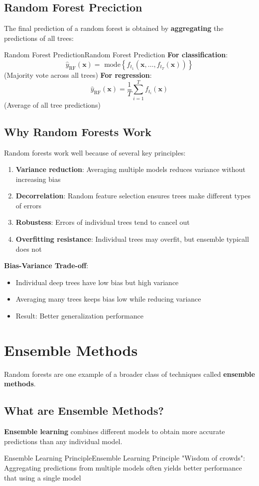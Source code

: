 \documentclass[a4paper]{article}
\theoremstyle{definition}
\begin{document}
\subsection{Random Forest Preciction}
The final prediction of a random forest is obtained by \textbf{aggregating} the predictions of all trees:
\begin{definition}{Random Forest Prediction}{Random Forest Prediction}
\textbf{For classification}:
\[
  \hat{y}_{\text{RF}}(\mathbf{x}) = \text{ mode}\left\{ f_{t_1}(\mathbf{x}, \ldots, f_{t_T}(\mathbf{x})) \right\} 
\]
(Majority vote across all trees)
\vspace{1em}
\noindent
\newline
\textbf{For regression}:
\[
  \hat{y}_{\text{RF}}(\mathbf{x}) = \frac{1}{T} \sum_{i = 1}^{T} f_{t_i}(\mathbf{x})
\]
(Average of all tree predictions)
\end{definition}
\subsection{Why Random Forests Work}
Random forests work well because of several key principles:
\begin{enumerate}
    \item \textbf{Variance reduction}: Averaging multiple models reduces variance without increasing bias 
    \item \textbf{Decorrelation}: Random feature selection ensures trees make different types of errors 
    \item \textbf{Robustess}: Errors of individual trees tend to cancel out 
    \item \textbf{Overfitting resistance}: Individual trees may overfit, but ensemble typicall does not
\end{enumerate}
\textbf{Bias-Variance Trade-off}:
\begin{itemize}
    \item Individual deep trees have low bias but high variance 
    \item Averaging many trees keeps bias low while reducing variance 
    \item Result: Better generalization performance 
\end{itemize}
\section{Ensemble Methods}
Random forests are one example of a broader class of techniques called \textbf{ensemble methods}.
\subsection{What are Ensemble Methods?}
\textbf{Ensemble learning} combines different models to obtain more accurate predictions than any individual model.
\begin{definition}{Ensemble Learning Principle}{Ensemble Learning Principle}
"Wisdom of crowds": Aggregating predictions from multiple models often yields better performance that using a single model
\end{definition}
\end{document}
